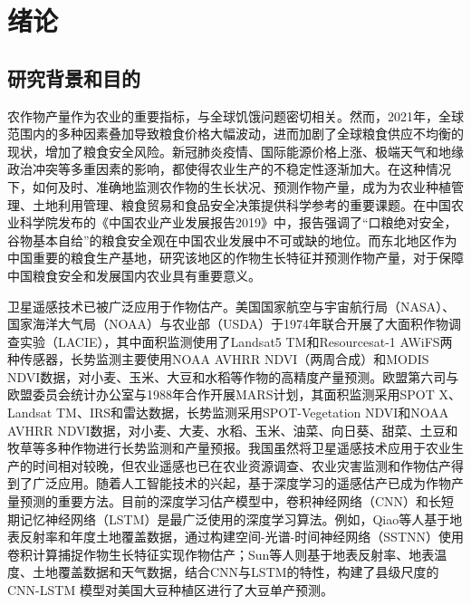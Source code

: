 \cleardoublepage

\section{绪论}

\subsection{研究背景和目的}
\par 农作物产量作为农业的重要指标，与全球饥饿问题密切相关。然而，2021年，全球范围内的多种因素叠加导致粮食价格大幅波动，进而加剧了全球粮食供应不均衡的现状，增加了粮食安全风险。新冠肺炎疫情、国际能源价格上涨、极端天气和地缘政治冲突等多重因素的影响，都使得农业生产的不稳定性逐渐加大。在这种情况下，如何及时、准确地监测农作物的生长状况、预测作物产量，成为为农业种植管理、土地利用管理、粮食贸易和食品安全决策提供科学参考的重要课题。在中国农业科学院发布的《中国农业产业发展报告2019》中，报告强调了“口粮绝对安全，谷物基本自给”的粮食安全观在中国农业发展中不可或缺的地位\cite{中国农业科学院2019中国农业产业发展报告}。而东北地区作为中国重要的粮食生产基地，研究该地区的作物生长特征并预测作物产量，对于保障中国粮食安全和发展国内农业具有重要意义。


\par 卫星遥感技术已被广泛应用于作物估产。美国国家航空与宇宙航行局（NASA）、国家海洋大气局（NOAA）与农业部（USDA）于1974年联合开展了大面积作物调查实验（LACIE），其中面积监测使用了Landsat5 TM和Resourcesat-1 AWiFS两种传感器，长势监测主要使用NOAA AVHRR NDVI（两周合成）和MODIS NDVI数据，对小麦、玉米、大豆和水稻等作物的高精度产量预测\cite{erickson1984lacie}。欧盟第六司与欧盟委员会统计办公室与1988年合作开展MARS计划，其面积监测采用SPOT X、Landsat TM、IRS和雷达数据，长势监测采用SPOT-Vegetation NDVI和NOAA AVHRR NDVI数据，对小麦、大麦、水稻、玉米、油菜、向日葵、甜菜、土豆和牧草等多种作物进行长势监测和产量预报\cite{刘海启1999欧盟MARS}。我国虽然将卫星遥感技术应用于农业生产的时间相对较晚，但农业遥感也已在农业资源调查、农业灾害监测和作物估产得到了广泛应用。随着人工智能技术的兴起，基于深度学习的遥感估产已成为作物产量预测的重要方法。目前的深度学习估产模型中，卷积神经网络（CNN）和长短期记忆神经网络（LSTM）是最广泛使用的深度学习算法。例如，Qiao等人基于地表反射率和年度土地覆盖数据，通过构建空间-光谱-时间神经网络（SSTNN）使用卷积计算捕捉作物生长特征实现作物估产\cite{qiao2021crop}；Sun等人则基于地表反射率、地表温度、土地覆盖数据和天气数据，结合CNN与LSTM的特性，构建了县级尺度的 CNN-LSTM 模型对美国大豆种植区进行了大豆单产预测\cite{sun2019county}。

